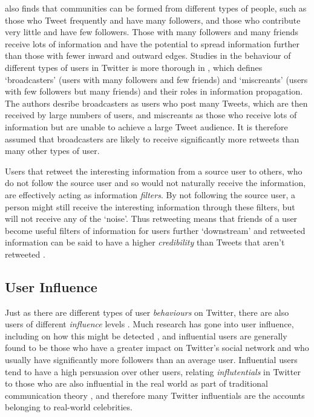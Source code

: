 \cite{java07} also finds that communities can be formed from different types of people, such as those who Tweet frequently and have many followers, and those who contribute very little and have few followers. Those with many followers and many friends receive lots of information and have the potential to spread information further than those with fewer inward and outward edges. Studies in the behaviour of different types of users in Twitter is more thorough in \cite{krishnamurthy08}, which defines `broadcasters' (users with many followers and few friends) and `miscreants' (users with few followers but many friends) and their roles in information propagation. The authors desribe broadcasters as users who post many Tweets, which are then received by large numbers of users, and miscreants as those who receive lots of information but are unable to achieve a large Tweet audience. It is therefore assumed that broadcasters are likely to receive significantly more retweets than many other types of user.

Users that retweet the interesting information from a source user to others, who do not follow the source user and so would not naturally receive the information, are effectively acting as information \textit{filters}. By not following the source user, a person might still receive the interesting information through these filters, but will not receive any of the `noise'. Thus retweeting means that friends of a user become useful filters of information for users further `downstream'  and retweeted information can be said to have a higher \textit{credibility} than Tweets that aren't retweeted \cite{castillo11}.


\subsection{User Influence}
Just as there are different types of user \textit{behaviours} on Twitter, there are also users of different \textit{influence} levels \cite{quercia11}. Much research has gone into user influence, including on how this might be detected \cite{yu11}, and influential users are generally found to be those who have a greater impact on Twitter's social network \cite{bakshy11} and who usually have significantly more followers than an average user. Influential users tend to have a high persuasion over other users, relating \textit{influtentials} in Twitter to those who are also influential in the real world as part of traditional communication theory \cite{cha10}, and therefore many Twitter influentials are the accounts belonging to real-world celebrities.

